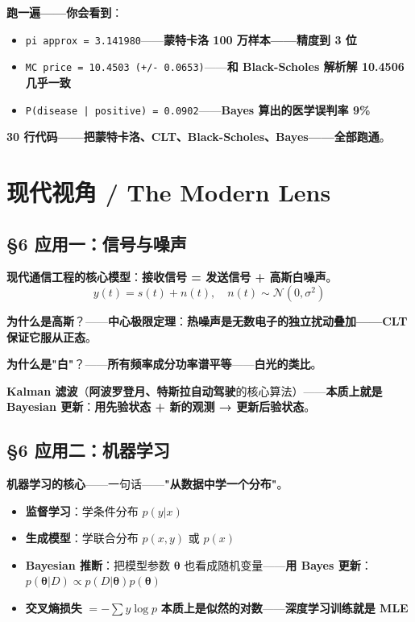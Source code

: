 \textbf{跑一遍——你会看到}：

\begin{itemize}
\item \texttt{pi approx = 3.141980}——\textbf{蒙特卡洛 100 万样本——精度到 3 位}
\item \texttt{MC price = 10.4503 (+/- 0.0653)}——\textbf{和 Black-Scholes 解析解 10.4506 几乎一致}
\item \texttt{P(disease | positive) = 0.0902}——\textbf{Bayes 算出的医学误判率 9\%}
\end{itemize}

\textbf{30 行代码——把蒙特卡洛、CLT、Black-Scholes、Bayes——全部跑通}。

\section{现代视角 / The Modern Lens}

\subsection{§6 应用一：信号与噪声}

\textbf{现代通信工程的核心模型}：\textbf{接收信号 = 发送信号 + 高斯白噪声}。
\begin{equation}
y(t) = s(t) + n(t), \quad n(t) \sim \mathcal{N}(0, \sigma^2)
\end{equation}

\textbf{为什么是高斯}？——\textbf{中心极限定理}：\textbf{热噪声是无数电子的独立扰动叠加——CLT 保证它服从正态}。

\textbf{为什么是"白"}？——\textbf{所有频率成分功率谱平等}——\textbf{白光的类比}。

\textbf{Kalman 滤波}（\textbf{阿波罗登月、特斯拉自动驾驶}的核心算法）——\textbf{本质上就是 Bayesian 更新}：\textbf{用先验状态 + 新的观测 → 更新后验状态}。

\subsection{§6 应用二：机器学习}

\textbf{机器学习的核心}——一句话——\textbf{"从数据中学一个分布"}。

\begin{itemize}
\item \textbf{监督学习}：学条件分布 $p(y|x)$
\item \textbf{生成模型}：学联合分布 $p(x,y)$ 或 $p(x)$
\item \textbf{Bayesian 推断}：把模型参数 $\bm{\theta}$ 也看成随机变量——\textbf{用 Bayes 更新}：$p(\bm{\theta}|D) \propto p(D|\bm{\theta}) p(\bm{\theta})$
\item \textbf{交叉熵损失} $= -\sum y \log p$ \textbf{本质上是似然的对数}——\textbf{深度学习训练就是 MLE}
\end{itemize}

